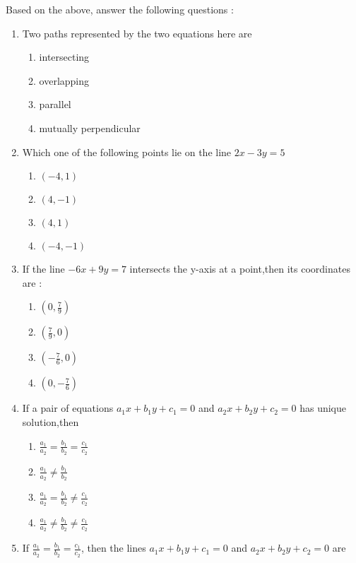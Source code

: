 \documentclass{article}
\providecommand{\brak}[1]{\ensuremath{\left(#1\right)}}
\begin{document}
\begin{enumerate}
Based on the above, answer the following questions :
 \begin{enumerate}[label=(\roman*)]
 \item Two paths represented by the two equations here are 
  \begin{enumerate}[label=(\Alph*)]
             \item intersecting
             \item overlapping
             \item parallel
             \item mutually perpendicular
    \end{enumerate}
\item Which one of the following points lie on the line $2x-3y=5$
\begin{enumerate}[label=(\Alph*)]
             \item $\brak{ -4,1 }$
             \item $\brak{ 4,-1 }$
             \item $\brak{ 4,1 }$
             \item $\brak{ -4,-1 }$
    \end{enumerate}
\item If the line $-6x+9y=7$ intersects the y-axis at a point,then its coordinates are :
\begin{enumerate}[label=(\Alph*)]
             \item $\brak{0,\frac{7}{9}}$
             \item $\brak{\frac{7}{9},0}$
             \item $\brak{-\frac{7}{6},0}$
             \item $\brak{0,-\frac{7}{6}}$
\end{enumerate}
\item If a pair of equations $a_1x+b_1y+c_1=0$ and  $a_2x+b_2y+c_2=0$ has unique solution,then
\begin{enumerate}[label=(\Alph*)]
             \item $\frac{a_1}{a_2}=\frac{b_1}{b_2}=\frac{c_1}{c_2}$
             \item  $\frac{a_1}{a_2}\neq\frac{b_1}{b_2}$
             \item $\frac{a_1}{a_2}=\frac{b_1}{b_2}\neq\frac{c_1}{c_2}$
             \item $\frac{a_1}{a_2}\neq\frac{b_1}{b_2}\neq\frac{c_1}{c_2}$
\end{enumerate}
\item If $\frac{a_1}{a_2}=\frac{b_1}{b_2}=\frac{c_1}{c_2}$, then the lines $a_1x+b_1y+c_1=0$ and  $a_2x+b_2y+c_2=0$ are

\end{enumerate}
\end{enumerate}
\end{document}
